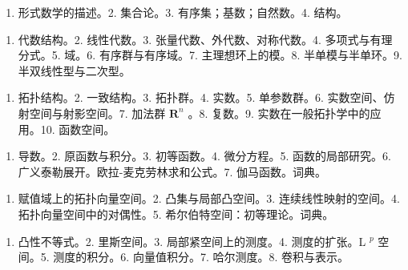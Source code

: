 

\begin{enumerate}
\def\labelenumi{\arabic{enumi}.}
\tightlist
\item
  形式数学的描述。2. 集合论。3. 有序集；基数；自然数。4. 结构。
\end{enumerate}


\begin{enumerate}
\def\labelenumi{\arabic{enumi}.}
\tightlist
\item
  代数结构。2. 线性代数。3. 张量代数、外代数、对称代数。4. 多项式与有理分式。5. 域。6. 有序群与有序域。7. 主理想环上的模。8. 半单模与半单环。9. 半双线性型与二次型。
\end{enumerate}


\begin{enumerate}
\def\labelenumi{\arabic{enumi}.}
\tightlist
\item
  拓扑结构。2. 一致结构。3. 拓扑群。4. 实数。5. 单参数群。6. 实数空间、仿射空间与射影空间。7. 加法群 \(\mathbf{R}^n\) 。8. 复数。9. 实数在一般拓扑学中的应用。10. 函数空间。
\end{enumerate}


\begin{enumerate}
\def\labelenumi{\arabic{enumi}.}
\tightlist
\item
  导数。2. 原函数与积分。3. 初等函数。4. 微分方程。5. 函数的局部研究。6. 广义泰勒展开。欧拉-麦克劳林求和公式。7. 伽马函数。词典。
\end{enumerate}


\begin{enumerate}
\def\labelenumi{\arabic{enumi}.}
\tightlist
\item
  赋值域上的拓扑向量空间。2. 凸集与局部凸空间。3. 连续线性映射的空间。4. 拓扑向量空间中的对偶性。5. 希尔伯特空间：初等理论。词典。
\end{enumerate}


\begin{enumerate}
\def\labelenumi{\arabic{enumi}.}
\tightlist
\item
  凸性不等式。2. 里斯空间。3. 局部紧空间上的测度。4. 测度的扩张。L \(^{p}\) 空间。5. 测度的积分。6. 向量值积分。7. 哈尔测度。8. 卷积与表示。
\end{enumerate}

